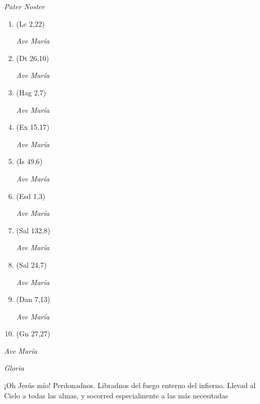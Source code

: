 \documentclass[a4paper,11pt, oneside]{report}
\begin{document}
        \textit{Pater Noster}

        \begin{enumerate}
          
          \item (Lc 2,22)
          
          \textit{Ave María}

          \item (Dt 26,10)
          
          \textit{Ave María}

          \item (Hag 2,7)
          
          \textit{Ave María}

          \item (Ex 15,17)
          
          \textit{Ave María}

          \item (Is 49,6)

          \textit{Ave María}

          \item (Esd 1,3)
          
          \textit{Ave María}

          \item (Sal 132,8)
          
          \textit{Ave María}

          \item (Sal 24,7)
          
          \textit{Ave María}

          \item (Dan 7,13)
          
          \textit{Ave María}

          \item (Gn 27,27)

        \end{enumerate}

        \textit{Ave María} \par
        \indent\textit{Gloria} \par
        \indent¡Oh Jesús mío! Perdonadnos. Libradnos del fuego enterno del infierno. Llevad al Cielo a todas las almas, y socorred especialmente a las más 
        necesitadas
            
\end{document}
